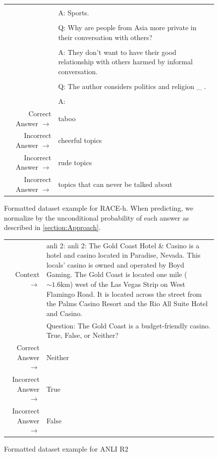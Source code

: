 \documentclass{article}
\begin{document}
\begin{figure}[!h]
{\begin{tabularx}{\linewidth}{r X}
 &  \\ 
 & A: Sports. \\ 
 &  \\ 
 & Q: Why are people from Asia more private in their conversation with others? \\ 
 &  \\ 
 & A: They don't want to have their good relationship with others harmed by informal conversation. \\ 
 &  \\ 
 & Q: The author considers politics and religion   \_  . \\ 
 &  \\ 
 & A: \\ 
 \midrule Correct Answer $\to$ & taboo \\ 
 Incorrect Answer $\to$ & cheerful topics \\ 
 Incorrect Answer $\to$ & rude topics \\ 
 Incorrect Answer $\to$ & topics that can never be talked about\\ \bottomrule \end{tabularx} }  \caption{Formatted dataset example for RACE-h. When predicting, we normalize by the unconditional probability of each answer as described in \ref{section:Approach}.}  \label{eval:RACE-h}  \end{figure}
\begin{figure} { \tt \footnotesize \begin{tabularx}{\linewidth}{r X} \toprule Context $\to$ & anli 2: anli 2: The Gold Coast Hotel \& Casino is a hotel and casino located in Paradise, Nevada. This locals' casino is owned and operated by Boyd Gaming. The Gold Coast is located one mile ($\sim1.6\mathrm{km}$) west of the Las Vegas Strip on West Flamingo Road. It is located across the street from the Palms Casino Resort and the Rio All Suite Hotel and Casino. \\
 & Question: The Gold Coast is a budget-friendly casino. True, False, or Neither? \\ 
 \midrule Correct Answer $\to$ & Neither \\ 
 Incorrect Answer $\to$ & True \\ 
 Incorrect Answer $\to$ & False\\ \bottomrule \end{tabularx} }  \caption{Formatted dataset example for ANLI R2}  \label{eval:ANLI R2}  \end{figure}
\end{document}
